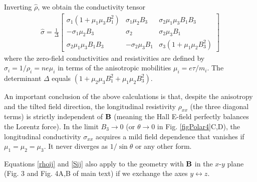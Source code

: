 Inverting $\hat\rho$, we obtain the conductivity tensor 
\begin{eqnarray}
\hat{\sigma} = 
						\frac{1}{\Delta}\left[  	\begin{array}{ccc}
								\sigma_1(1+\mu_1\mu_3 B_1^2)  &  \sigma_1\mu_2B_3   &   \sigma_2\mu_1\mu_3 B_1B_3 \\
								 -\sigma_1\mu_2B_3									&   \sigma_2   									&   \sigma_2\mu_3B_1   \\
								\sigma_2\mu_1\mu_3 B_1B_3     &    -\sigma_2\mu_3B_1      &   \sigma_3(1+\mu_1\mu_2B_3^2)
								\end{array}
								\right]
				\label{Sij}
				\end{eqnarray}
where the zero-field conductivities and resistivities are defined by $\sigma_i = 1/\rho_i = ne\mu_i $ in terms of the anisotropic
mobilities $\mu_i = e\tau/m_i$. The determinant $\Delta$ equals $(1+\mu_2\mu_3 B_1^2+ \mu_1\mu_2 B_3^2)$.

An important conclusion of the above calculations is that, despite the anisotropy and the tilted field direction, the longitudinal resistivity 
$\rho_{xx}$ (the three diagonal terms) is strictly independent of $\bf B$ (meaning the Hall E-field perfectly balances the Lorentz force). In the limit $B_3\to 0$ (or $\theta\to 0$ in Fig. \ref{figPolar4}C,D), the longitudinal conductivity $\sigma_{xx}$ acquires a mild field dependence that vanishes if $\mu_1 = \mu_2 = \mu_3$. It never diverges as $1/\sin\theta$ or any other form.

Equations \ref{rhoij} and \ref{Sij} also apply to the geometry with $\bf B$ in the $x$-$y$ plane (Fig. 3 and Fig. 4A,B of main text) if we exchange the axes $y\leftrightarrow z$.
